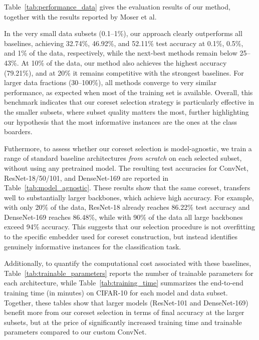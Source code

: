 \documentclass{article}
\begin{document}


Table~\ref{tab:performance_data} gives the evaluation results of our method,
together with the results reported by Moser et al.

In the very small data subsets (0.1–1\%), our approach clearly outperforms all baselines, 
achieving 32.74\%, 46.92\%, and 52.11\% test accuracy at 0.1\%, 0.5\%, and 1\% of the data, 
respectively, while the next-best methods remain below 25–43\%. 
At 10\% of the data, our method also achieves the highest accuracy (79.21\%), 
and at 20\% it remains competitive with the strongest baselines. 
For larger data fractions (30–100\%), all methods converge to very similar performance, 
as expected when most of the training set is available. 
Overall, this benchmark indicates that our coreset selection strategy is particularly 
effective in the smaller subsets, where subset quality matters the most, further highlighting our hypothesis 
that the most informative instances are the ones at the class boarders.


Futhermore, to assess whether our coreset selection is model-agnostic, we train a range of standard 
baseline architectures \emph{from scratch} on each selected subset, without using any pretrained model. 
The resulting test accuracies for ConvNet, ResNet-18/50/101, and DenseNet-169 are reported 
in Table~\ref{tab:model_agnostic}. 
These results show that the same coreset, transfers well to substantially larger backbones, which achieve high accuracy.
For example, with only 20\% of the data, ResNet-18 already reaches 86.22\% test accuracy and 
DenseNet-169 reaches 86.48\%, while with 90\% of the data all large backbones exceed 94\% accuracy.
This suggests that our selection procedure is not overfitting to the specific embedder used for coreset construction, 
but instead identifies genuinely informative instances for the classification task.

Additionally, to quantify the computational cost associated with these baselines, Table~\ref{tab:trainable_parameters} 
reports the number of trainable parameters for each architecture, while Table~\ref{tab:training_time} 
summarizes the end-to-end training time (in minutes) on CIFAR-10 for each model and data subset. 
Together, these tables show that larger models (ResNet-101 and DenseNet-169) benefit more from 
our coreset selection in terms of final accuracy at the larger subsets, but at the price of significantly 
increased training time and trainable parameters compared to our custom ConvNet.
\end{document}
